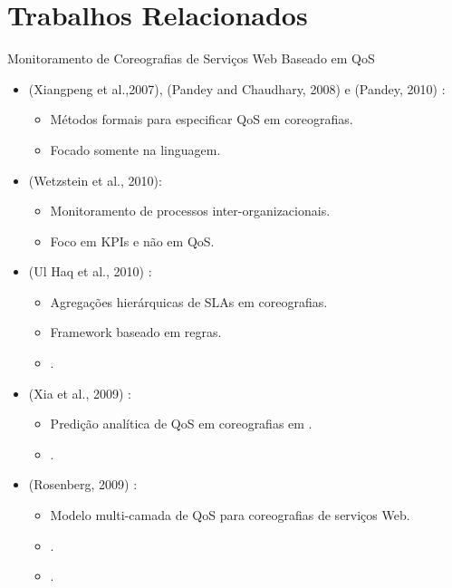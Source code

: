 \documentclass[xcolor=svgnames]{beamer}
\begin{document}
\section{Trabalhos Relacionados}
  \begin{frame}{ Monitoramento de Coreografias de Serviços Web Baseado em QoS }

      \begin{itemize}
	\item <1-> \small{ (Xiangpeng et al.,2007), (Pandey and Chaudhary, 2008) e (Pandey, 2010)} :
	 \begin{itemize}
	    \item Métodos formais para especificar QoS em coreografias.
	    \item \color{red} {Focado somente na linguagem}.
	 \end{itemize}
	\item <2-> \small{ (Wetzstein et al., 2010)}:
	    \begin{itemize}
	      \item Monitoramento de processos inter-organizacionais.
	      \item \color{red} {Foco em KPIs e não em QoS}.
	    \end{itemize}


	\item <3-> \small{ (Ul Haq et al., 2010) }:
	    \begin{itemize}
	      \item Agregações hierárquicas de SLAs em coreografias.
	      \item Framework baseado em regras.
	      \item \color{red}{Foco em processos de negócio e KPIs}.
	    \end{itemize}
	\item <4-> \small{ (Xia et al., 2009) }:
	    \begin{itemize}
	      \item Predição analítica de QoS em coreografias em \color{red}{WSCI}. %
	      \item \color{red}{Foco na linguagem}.
	    \end{itemize}
	\item <5-> \small{ (Rosenberg, 2009) }:
	    \begin{itemize}
	      \item Modelo multi-camada  de QoS para coreografias de serviços Web.
	      \item \color{red}{Sem uma técnica para estabelecer SLAs}.
          \item \color{red}{Foco em restrições rígidas}.
	    \end{itemize}
      \end{itemize}

   \end{frame}
\end{document}
